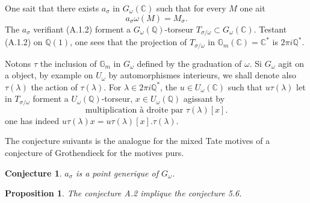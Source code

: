 \documentclass[11pt,a4paper]{article}
\theoremstyle{plain}
\newtheorem{proposition}[theorem]{Proposition}
\newtheorem{conjecture}[theorem]{Conjecture}
\theoremstyle{definition}
\newcommand{\Gm}{\mathbb{G}_m}
\newcommand{\Q}{\mathbb{Q}}
\newcommand{\C}{\mathbb{C}}
\begin{document}
One sait that there exists $a_\sigma$ in $G_\omega(\C)$ such that for every $M$ one ait
\begin{equation}\label{eq:A.1.2}
a_\sigma \omega(M) = M_\sigma.
\end{equation}
The $a_\sigma$ verifiant (A.1.2) forment a $G_\omega(\Q)$-torseur $T_{\sigma/\omega} \subset G_\omega(\C)$. Testant (A.1.2) on $\Q(1)$, one sees that the projection of $T_{\sigma/\omega}$ in $\Gm(\C) = \C^*$ is $2\pi i \Q^*$.

Notons $\tau$ the inclusion of $\Gm$ in $G_\omega$ defined by the graduation of $\omega$. Si $G_\omega$ agit on a object, by example on $U_\omega$ by automorphismes interieurs, we shall denote also $\tau(\lambda)$ the action of $\tau(\lambda)$. For $\lambda \in 2\pi i \Q^*$, the $u \in U_\omega(\C)$ such that $u \tau(\lambda)$ let in $T_{\sigma/\omega}$ forment a $U_\omega(\Q)$-torseur, $x \in U_\omega(\Q)$ agissant by
\begin{equation}\label{eq:A.1.3}
\text{multiplication \`a droite par } \tau(\lambda)[x].
\end{equation}
one has indeed $u \tau(\lambda) x = u \tau(\lambda)[x].\tau(\lambda)$.

The conjecture suivants is the analogue for the mixed Tate motives of a conjecture of Grothendieck for the motives purs.

\begin{conjecture}\label{conj:A.2}
$a_\sigma$ is a point generique of $G_\omega$.
\end{conjecture}

\begin{proposition}\label{prop:A.3}
The conjecture A.2 implique the conjecture 5.6.
\end{proposition}
\end{document}
